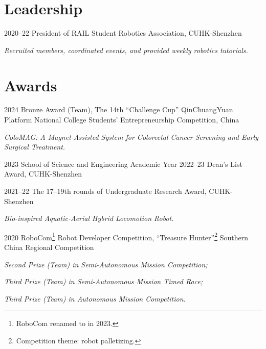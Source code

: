 \documentclass[11pt,letterpaper]{report}
\begin{document}
	
\section*{Leadership}
\begin{tablist}
	\item[2020--22]   \tab President of RAIL Student Robotics Association, CUHK-Shenzhen 
	
	\textit{Recruited members, coordinated events, and provided weekly robotics tutorials.}
\end{tablist}
	
\section*{Awards}
\begin{tablist}	
%	
%	
	
	\item[2024] \tab Bronze Award (Team), The 14th ``Challenge Cup'' QinChuangYuan Platform National College Students' Entrepreneurship Competition, China

	\textit{ColoMAG: A Magnet-Assisted System for Colorectal Cancer Screening and Early Surgical Treatment.}	

	\item[2023]   \tab School of Science and Engineering Academic Year 2022--23 Dean's List Award, CUHK-Shenzhen
	\item[2021--22]   \tab The 17--19th rounds of  Undergraduate Research Award, CUHK-Shenzhen
	
	\textit{Bio-inspired Aquatic-Aerial Hybrid Locomotion Robot.}
	
	\item[2020] \tab RoboCom\footnote{RoboCom renamed to  in 2023.} Robot Developer Competition, ``Treasure Hunter''\footnote{Competition theme: robot palletizing.} Southern China Regional Competition
	
	\textit{Second Prize (Team) in Semi-Autonomous Mission Competition;}
	
	\textit{Third Prize (Team) in Semi-Autonomous Mission Timed Race;}
	
	\textit{Third Prize (Team) in Autonomous Mission Competition.}
\end{tablist}
	
\end{document}
